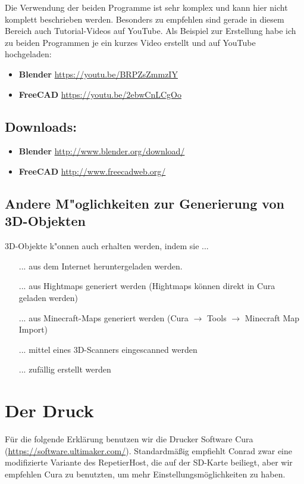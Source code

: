 \documentclass[11pt,a4paper]{scrartcl}
\begin{document}
Die Verwendung der beiden Programme ist sehr komplex und kann hier nicht komplett beschrieben werden. Besonders zu empfehlen sind gerade in diesem Bereich auch Tutorial-Videos auf YouTube. Als Beispiel zur Erstellung habe ich zu beiden Programmen je ein kurzes Video erstellt und auf YouTube hochgeladen:
\begin{itemize}
  \item \textbf{Blender} \url{https://youtu.be/BRPZsZmmzIY}
  \item \textbf{FreeCAD} \url{https://youtu.be/2ebwCnLCgOo}
\end{itemize}

\subsection*{Downloads:}
\begin{itemize}
  \item \textbf{Blender} \url{http://www.blender.org/download/}
  \item \textbf{FreeCAD} \url{http://www.freecadweb.org/}
\end{itemize}

\subsection*{Andere M"oglichkeiten zur Generierung von 3D-Objekten}
3D-Objekte k"onnen auch erhalten werden, indem sie ...
\begin{itemize}
  \item[...] aus dem Internet heruntergeladen werden.
  \item[...] aus Hightmaps generiert werden (Hightmaps können direkt in Cura geladen werden)
  \item[...] aus Minecraft-Maps generiert werden (Cura $\rightarrow$ Tools $\rightarrow$ Minecraft Map Import)
  \item[...] mittel eines 3D-Scanners eingescanned werden
  \item[...] zufällig erstellt werden
\end{itemize}

\section{Der Druck}
Für die folgende Erklärung benutzen wir die Drucker Software Cura (\url{https://software.ultimaker.com/}). Standardmäßig empfiehlt Conrad zwar eine modifizierte Variante des RepetierHost, die auf der SD-Karte beiliegt, aber wir empfehlen Cura zu benutzten, um mehr Einstellungsmöglichkeiten zu haben.
\end{document}
